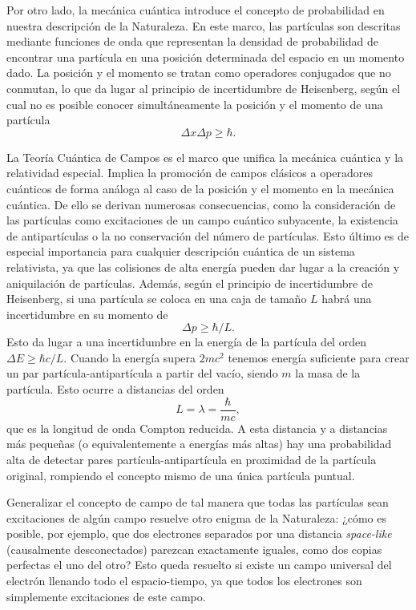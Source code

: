 Por otro lado, la mecánica cuántica introduce el concepto de probabilidad en nuestra descripción de la Naturaleza. En este marco, las partículas son descritas mediante funciones de onda que representan la densidad de probabilidad de encontrar una partícula en una posición determinada del espacio en un momento dado. La posición y el momento se tratan como operadores conjugados que no conmutan, lo que da lugar al principio de incertidumbre de Heisenberg, según el cual no es posible conocer simultáneamente la posición y el momento de una partícula
\begin{equation*}
\Delta x\Delta p\geq\hbar.
\end{equation*} 

La Teoría Cuántica de Campos es el marco que unifica la mecánica cuántica y la relatividad especial. Implica la promoción de campos clásicos a operadores cuánticos de forma análoga al caso de la posición y el momento en la mecánica cuántica. De ello se derivan numerosas consecuencias, como la consideración de las partículas como excitaciones de un campo cuántico subyacente, la existencia de antipartículas o la no conservación del número de partículas. Esto último es de especial importancia para cualquier descripción cuántica de un sistema relativista, ya que las colisiones de alta energía pueden dar lugar a la creación y aniquilación de partículas. Además, según el principio de incertidumbre de Heisenberg, si una partícula se coloca en una caja de tamaño $L$ habrá una incertidumbre en su momento de
\begin{equation*}
\Delta p\geq\hbar/L.
\end{equation*}
Esto da lugar a una incertidumbre en la energía de la partícula del orden $\Delta E\geq\hbar c/L$. Cuando la energía supera $2mc^2$ tenemos energía suficiente para crear un par partícula-antipartícula a partir del vacío, siendo $m$ la masa de la partícula. Esto ocurre a distancias del orden 
\begin{equation*}
L=\lambda=\frac{\hbar}{mc},
\end{equation*}
que es la longitud de onda Compton reducida. A esta distancia y a distancias más pequeñas (o equivalentemente a energías más altas) hay una probabilidad alta de detectar pares partícula-antipartícula en proximidad de la partícula original, rompiendo el concepto mismo de una única partícula puntual. 

Generalizar el concepto de campo de tal manera que todas las partículas sean excitaciones de algún campo resuelve otro enigma de la Naturaleza: ¿cómo es posible, por ejemplo, que dos electrones separados por una distancia \textit{space-like} (causalmente desconectados) parezcan exactamente iguales, como dos copias perfectas el uno del otro? Esto queda resuelto si existe un campo universal del electrón llenando todo el espacio-tiempo, ya que todos los electrones son simplemente excitaciones de este campo. 


